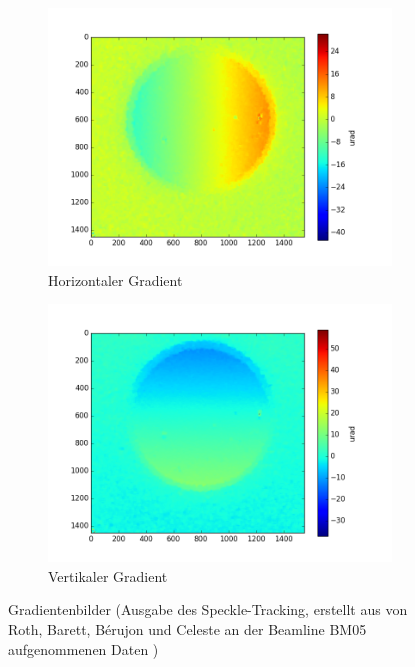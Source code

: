 \begin{figure}[htbp]
	\centering
	\begin{subfigure}[b]{0.45\textwidth}
		\centering
		\includegraphics[width=\textwidth]{img/SpeckDisH_E10001_edf_ref_start0001_1-10_edf}
		\caption[Horizontaler Gradient]{Horizontaler Gradient}
		\label{fig:hor_grad}
	\end{subfigure}
	\begin{subfigure}[b]{0.45\textwidth}
		\centering
		\includegraphics[width=\textwidth]{img/SpeckDisV_E10001_edf_ref_start0001_1-10_edf}
		\caption[Vertikaler Gradient]{Vertikaler Gradient}
		\label{fig:vert_grad}
	\end{subfigure}
	\caption[Gradient]{Gradientenbilder (Ausgabe des Speckle-Tracking, erstellt aus von Roth, Barett, Bérujon und Celeste an der Beamline BM05 aufgenommenen Daten \cite{RBB+17})}
	\label{fig:gradienten}
\end{figure}

